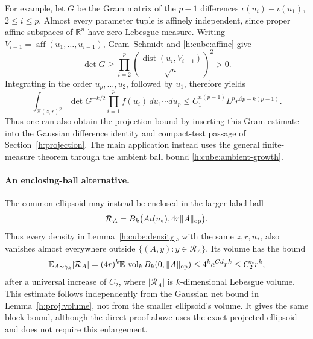 For example, let \(G\) be the Gram matrix of the \(p-1\) differences
\(\iota(u_i)-\iota(u_1)\), \(2\le i\le p\).
Almost every parameter tuple is affinely independent, since proper
affine subspaces of \(\mathbb R^n\) have zero Lebesgue measure.
Writing \(V_{i-1}=\operatorname{aff}(u_1,\ldots,u_{i-1})\),
Gram--Schmidt and \eqref{h:cube:affine} give
\begin{equation}\label{h:cube:gram}
 \det G\ge
 \prod_{i=2}^p
 \left(\frac{\operatorname{dist}(u_i,V_{i-1})}{\sqrt n}\right)^2>0.
\end{equation}
Integrating in the order \(u_p,\ldots,u_2\), followed by \(u_1\),
therefore yields
\[
 \int_{\mathcal B(z,r)^p}\det G^{-k/2}
             \prod_{i=1}^p f(u_i)\,du_1\cdots du_p
 \le C_1^{n(p-1)}L^p r^{\beta p-k(p-1)}.
\]
Thus one can also obtain the projection bound by inserting this Gram
estimate into the Gaussian difference identity and compact-test passage
of Section~\ref{h:projection}.  The main application instead uses the
general finite-measure theorem through the ambient ball bound
\eqref{h:cube:ambient-growth}.

\paragraph{An enclosing-ball alternative.}
The common ellipsoid may instead be enclosed in the larger label ball
\begin{equation}\label{h:cube:support}
 \mathcal R_A=B_k\bigl(A\iota(u_*),4r\|A\|_{\rm op}\bigr).
\end{equation}
Thus every density in Lemma~\ref{h:cube:density}, with the same
\(z,r,u_*\), also vanishes almost everywhere outside
\(\{(A,y):y\in\mathcal R_A\}\).  Its volume has the bound
\begin{equation}\label{h:cube:volume}
 \mathbb E_{A\sim\gamma_k}|\mathcal R_A|
 =(4r)^k\mathbb E\,\operatorname{vol}_k B_k(0,\|A\|_{\rm op})
 \le4^k e^{Cd}r^k\le C_2^n r^k,
\end{equation}
after a universal increase of \(C_2\), where
\(|\mathcal R_A|\) is \(k\)-dimensional Lebesgue volume.
This estimate follows independently from the Gaussian net bound in
Lemma~\ref{h:proj:volume}, not from the smaller ellipsoid's volume.
It gives the same block bound, although the direct proof above uses
the exact projected ellipsoid and does not require this enlargement.
